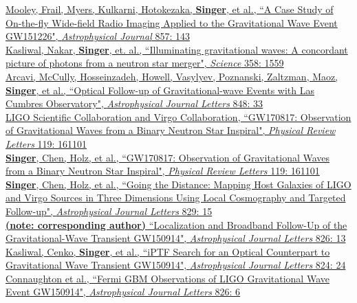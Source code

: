 \documentclass[10pt, letterpaper]{article} %
\newcommand{\years}[1]{\marginnote{\scriptsize #1}} %
\begin{document}
%
\years{2018}\href{https://doi.org/10.3847/1538-4357/aab7f3}{Mooley, Frail, Myers, Kulkarni, Hotokezaka, \textbf{Singer}, et al., “A Case Study of On-the-fly Wide-field Radio Imaging Applied to the Gravitational Wave Event GW151226", \emph{Astrophysical Journal} 857: 143}\\[0.125cm]
%
\years{2017}\href{https://doi.org/10.1126/science.aap9455}{Kasliwal, Nakar, \textbf{Singer}, et. al., “Illuminating gravitational waves: A concordant picture of photons from a neutron star merger", \emph{Science} 358: 1559}\\[0.125cm]
%
\years{2017}\href{https://doi.org/10.3847/2041-8213/aa910f}{Arcavi, McCully, Hosseinzadeh, Howell, Vasylyev, Poznanski, Zaltzman, Maoz, \textbf{Singer}, et al., “Optical Follow-up of Gravitational-wave Events with Las Cumbres Observatory", \emph{Astrophysical Journal Letters} 848: 33}\\[0.125cm]
%
\years{2017}\href{https://doi.org/10.1103/PhysRevLett.119.161101}{LIGO Scientific Collaboration and Virgo Collaboration, “GW170817: Observation of Gravitational Waves from a Binary Neutron Star Inspiral", \emph{Physical Review Letters} 119: 161101}\\[0.125cm]
%
\years{2017}\href{https://doi.org/10.1103/PhysRevLett.119.161101}{\textbf{Singer}, Chen, Holz, et al., “GW170817: Observation of Gravitational Waves from a Binary Neutron Star Inspiral", \emph{Physical Review Letters} 119: 161101}\\[0.125cm]
%
\years{2016}\href{https://dx.doi.org/10.3847/2041-8205/829/1/L15}{\textbf{Singer}, Chen, Holz, et al., “Going the Distance: Mapping Host Galaxies of LIGO and Virgo Sources in Three Dimensions Using Local Cosmography and Targeted Follow-up", \emph{Astrophysical Journal Letters} 829: 15}\\[0.125cm]
%
\years{2016}\href{https://dx.doi.org/10.3847/2041-8205/826/1/L13}{\textbf{(note: corresponding author)} “Localization and Broadband Follow-Up of the Gravitational-Wave Transient GW150914", \emph{Astrophysical Journal Letters} 826: 13}\\[0.125cm]
%
\years{2016}\href{https://dx.doi.org/10.3847/2041-8205/824/2/L24}{Kasliwal, Cenko, \textbf{Singer}, et al., “iPTF Search for an Optical Counterpart to Gravitational Wave Transient GW150914", \emph{Astrophysical Journal Letters} 824: 24}\\[0.125cm]
%
\years{2016}\href{https://dx.doi.org/10.3847/2041-8205/826/1/L6}{Connaughton et al., “Fermi GBM Observations of LIGO Gravitational Wave Event GW150914", \emph{Astrophysical Journal Letters} 826: 6}\\[0.125cm]
\end{document}
